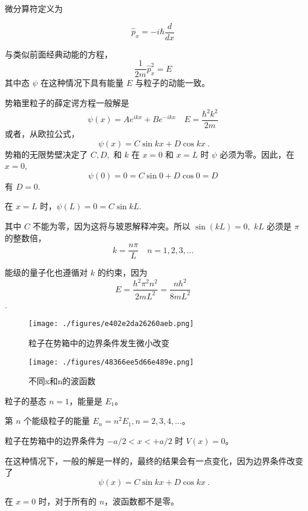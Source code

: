 微分算符定义为

\begin{equation}
\hat{p}_x = -i\hbar \frac{d}{dx}~
\end{equation}

与类似前面经典动能的方程，
$$\frac{1}{2m}\hat{p}_x^2 = E~$$其中态 $\psi$ 在这种情况下具有能量 $E$ 与粒子的动能一致。

势箱里粒子的薛定谔方程一般解是
\begin{equation}
\psi(x) = Ae^{ikx} + Be^{-ikx} \quad E = \frac{\hbar^2 k^2}{2m}~
\end{equation}
或者，从欧拉公式，
\begin{equation}
\psi(x) = C \sin kx + D \cos kx~.
\end{equation}
势箱的无限势壁决定了 $C, D,$ 和 $k$ 在 $x = 0$ 和 $x = L$ 时 $\psi$ 必须为零。因此，在 $x = 0$,
\begin{equation}
\psi(0) = 0 = C \sin 0 + D \cos 0 = D~
\end{equation}
有 $D = 0.$

在 $x = L$ 时，$\psi(L) = 0 = C \sin kL.$

其中 $C$ 不能为零，因为这将与玻恩解释冲突。所以 $\sin(kL) = 0,$ $kL$ 必须是 $\pi$ 的整数倍，
\begin{equation}
k = \frac{n\pi}{L} \quad n = 1,2,3,\ldots~
\end{equation}

能级的量子化也遵循对 $k$ 的约束，因为
$$E = \frac{h^2 \pi^2 n^2}{2mL^2} = \frac{n h^2}{8mL^2}~$$.

\begin{figure}[ht]
\centering
\texttt{[image: ./figures/e402e2da26260aeb.png]}
\caption{粒子在势箱中的边界条件发生微小改变} \label{fig_LZLX_7}
\end{figure}

\begin{figure}[ht]
\centering
\texttt{[image: ./figures/48366ee5d66e489e.png]}
\caption{不同x和n的波函数} \label{fig_LZLX_8}
\end{figure}

粒子的基态 $n=1$，能量是 $E_1$。

第 $n$ 个能级粒子的能量 $E_n = n^2 E_1, n = 2, 3, 4, \ldots$。

粒子在势箱中的边界条件为 $-a/2 < x < +a/2$ 时 $V(x) = 0$。

在这种情况下，一般的解是一样的，最终的结果会有一点变化，因为边界条件改变了
$$\psi(x) = C \sin kx + D \cos kx~.$$

在 $x = 0$ 时，对于所有的 $n$，波函数都不是零。

